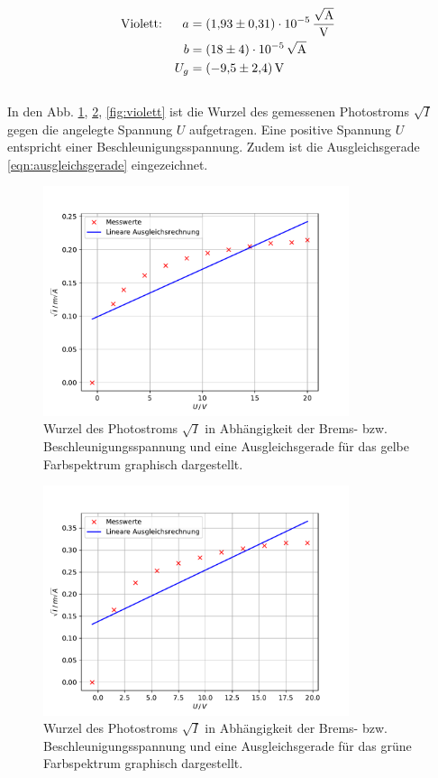 \\
\begin{align*}
  \text{Violett:} && a &= \SI{1.93(31)e-05}{\frac{\sqrt{\ampere}}{\volt}} &\\
  && b &= \SI{18(4)e-05}{\sqrt{\ampere}} &\\
  && U_g &= \SI{-9.5(24)}{\volt}
\end{align*}
\\
In den Abb. \ref{fig:gelb}, \ref{fig:gruen}, \ref{fig:violett} ist die Wurzel des gemessenen Photostroms $\sqrt{I}$ gegen die angelegte Spannung $U$ aufgetragen.
Eine positive Spannung $U$ entspricht einer Beschleunigungsspannung.
Zudem ist die Ausgleichsgerade \eqref{eqn:ausgleichsgerade} eingezeichnet.

\begin{figure}
  \centering
  \includegraphics[width=0.8\textwidth]{content/data/gelb.pdf}
  \caption{Wurzel des Photostroms $\sqrt{I}$ in Abhängigkeit der Brems- bzw. Beschleunigungsspannung und eine Ausgleichsgerade für das gelbe Farbspektrum graphisch dargestellt. \cite{matplotlib}\cite{scipy}\cite{numpy}}
  \label{fig:gelb}
\end{figure}
\begin{figure}
  \centering
  \includegraphics[width=0.8\textwidth]{content/data/gruen.pdf}
  \caption{Wurzel des Photostroms $\sqrt{I}$ in Abhängigkeit der Brems- bzw. Beschleunigungsspannung und eine Ausgleichsgerade für das grüne Farbspektrum graphisch dargestellt. \cite{matplotlib}\cite{scipy}\cite{numpy}}
  \label{fig:gruen}
\end{figure}
